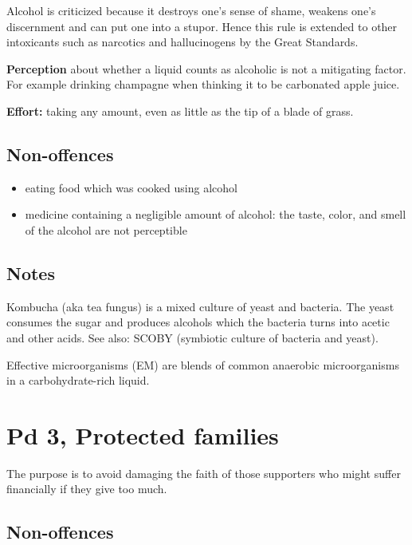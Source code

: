 Alcohol is criticized because it destroys one's sense of shame, weakens
one's discernment and can put one into a stupor. Hence this rule is
extended to other intoxicants such as narcotics and hallucinogens by the
Great Standards.

\textbf{Perception} about whether a liquid counts as alcoholic is not a
mitigating factor. For example drinking champagne when thinking it to be
carbonated apple juice.

\textbf{Effort:} taking any amount, even as little as the tip of a blade
of grass.

\subsection{Non-offences}

\begin{itemize}
\tightlist
\item
  eating food which was cooked using alcohol
\item
  medicine containing a negligible amount of alcohol: the taste, color,
  and smell of the alcohol are not perceptible
\end{itemize}

\subsection{Notes}

Kombucha (aka tea fungus) is a mixed culture of yeast and bacteria. The
yeast consumes the sugar and produces alcohols which the bacteria turns
into acetic and other acids. See also: SCOBY (symbiotic culture of
bacteria and yeast).

Effective microorganisms (EM) are blends of common anaerobic
microorganisms in a carbohydrate-rich liquid.

\clearpage

\section{Pd 3, Protected families}

The purpose is to avoid damaging the faith of those supporters who might
suffer financially if they give too much.

\subsection{Non-offences}

